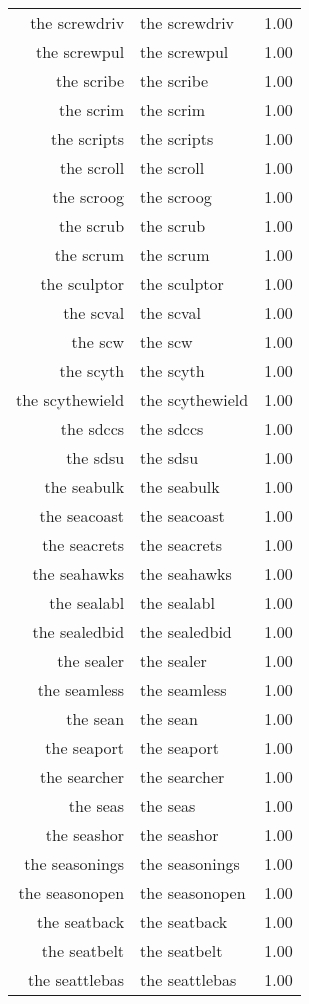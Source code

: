 \begin{table}[ht]
\begin{tabular}{rlr}
  the screwdriv & the screwdriv & 1.00 \\ 
  the screwpul & the screwpul & 1.00 \\ 
  the scribe & the scribe & 1.00 \\ 
  the scrim & the scrim & 1.00 \\ 
  the scripts & the scripts & 1.00 \\ 
  the scroll & the scroll & 1.00 \\ 
  the scroog & the scroog & 1.00 \\ 
  the scrub & the scrub & 1.00 \\ 
  the scrum & the scrum & 1.00 \\ 
  the sculptor & the sculptor & 1.00 \\ 
  the scval & the scval & 1.00 \\ 
  the scw & the scw & 1.00 \\ 
  the scyth & the scyth & 1.00 \\ 
  the scythewield & the scythewield & 1.00 \\ 
  the sdccs & the sdccs & 1.00 \\ 
  the sdsu & the sdsu & 1.00 \\ 
  the seabulk & the seabulk & 1.00 \\ 
  the seacoast & the seacoast & 1.00 \\ 
  the seacrets & the seacrets & 1.00 \\ 
  the seahawks & the seahawks & 1.00 \\ 
  the sealabl & the sealabl & 1.00 \\ 
  the sealedbid & the sealedbid & 1.00 \\ 
  the sealer & the sealer & 1.00 \\ 
  the seamless & the seamless & 1.00 \\ 
  the sean & the sean & 1.00 \\ 
  the seaport & the seaport & 1.00 \\ 
  the searcher & the searcher & 1.00 \\ 
  the seas & the seas & 1.00 \\ 
  the seashor & the seashor & 1.00 \\ 
  the seasonings & the seasonings & 1.00 \\ 
  the seasonopen & the seasonopen & 1.00 \\ 
  the seatback & the seatback & 1.00 \\ 
  the seatbelt & the seatbelt & 1.00 \\ 
  the seattlebas & the seattlebas & 1.00 \\ 

\end{tabular}
\end{table}
